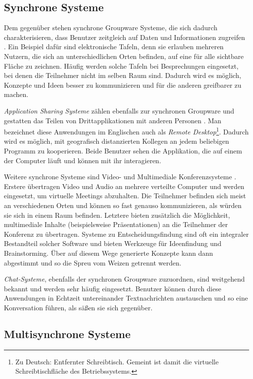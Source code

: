 \subsection{Synchrone Systeme}

Dem gegenüber stehen synchrone Groupware Systeme, die sich dadurch charakterisieren, dass Benutzer zeitgleich auf Daten und Informationen zugreifen \citep{Gerlicher:2007p241}. Ein Beispiel dafür sind elektronische Tafeln, denn sie erlauben mehreren Nutzern, die sich an unterschiedlichen Orten befinden, auf eine für alle sichtbare Fläche zu zeichnen. Häufig werden solche Tafeln bei Besprechungen eingesetzt, bei denen die Teilnehmer nicht im selben Raum sind. Dadurch wird es möglich, Konzepte und Ideen besser zu kommunizieren und für die anderen greifbarer zu machen.

\emph{Application Sharing Systeme} zählen ebenfalls zur synchronen Groupware und gestatten das Teilen von Drittapplikationen mit anderen Personen \citep{Gerlicher:2007p241}. Man bezeichnet diese Anwendungen im Englischen auch als \emph{Remote Desktop}\footnote{Zu Deutsch: Entfernter Schreibtisch. Gemeint ist damit die virtuelle Schreibtischfläche des Betriebssystems.}. Dadurch wird es möglich, mit geografisch distanzierten Kollegen an jedem beliebigen Programm zu kooperieren. Beide Benutzer sehen die Applikation, die auf einem der Computer läuft und können mit ihr interagieren. 

Weitere synchrone Systeme sind Video- und Multimediale Konferenzsysteme \citep{Gerlicher:2007p241}. Erstere übertragen Video und Audio an mehrere verteilte Computer und werden eingesetzt, um virtuelle Meetings abzuhalten. Die Teilnehmer befinden sich meist an verschiedenen Orten und können so fast genauso kommunizieren, als würden sie sich in einem Raum befinden. Letztere bieten zusätzlich die Möglichkeit, multimediale Inhalte (beispielsweise Präsentationen) an die Teilnehmer der Konferenz zu übertragen. Systeme zu Entscheidungsfindung sind oft ein integraler Bestandteil solcher Software und bieten Werkzeuge für Ideenfindung und Brainstorming. Über auf diesem Wege generierte Konzepte kann dann abgestimmt und so die Spreu vom Weizen getrennt werden. 

\emph{Chat-Systeme}, ebenfalls der synchronen Groupware zuzuordnen, sind weitgehend bekannt und werden sehr häufig eingesetzt. Benutzer können durch diese Anwendungen in Echtzeit untereinander Textnachrichten austauschen und so eine Konversation führen, als säßen sie sich gegenüber. 

\subsection{Multisynchrone Systeme}

